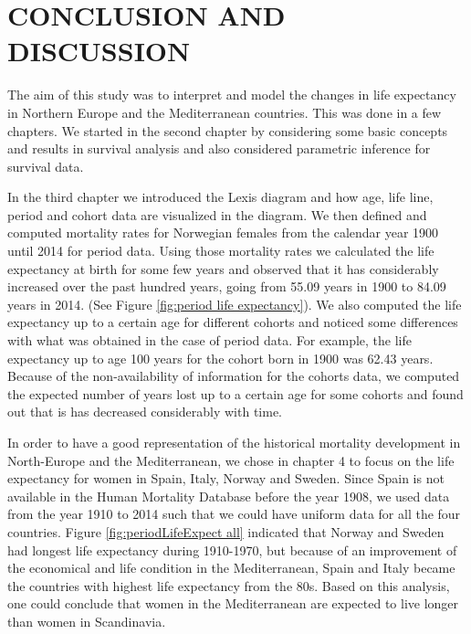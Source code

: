 
\chapter{CONCLUSION AND DISCUSSION}

The aim of this study was to interpret and model the changes in life expectancy in Northern Europe and the Mediterranean countries. This was done in a few chapters. 
We started in the second chapter by considering some basic concepts and results in survival analysis and also considered parametric inference for survival data. 

In the third chapter we introduced the Lexis diagram and how age, life line, period and cohort data are visualized in the diagram. We then defined and computed mortality rates for Norwegian females from the calendar year 1900 until 2014 for period data. Using those mortality rates we calculated the life expectancy at birth for some few years and observed that it has considerably increased over the past hundred years, going from 55.09 years in 1900 to 84.09 years in 2014. (See Figure \ref{fig:period life expectancy}). We also computed the life expectancy up to a certain age for different cohorts and noticed some differences with  what was obtained in the case of period data. For example, the life expectancy up to age 100 years for the cohort born in 1900 was 62.43 years. Because of the non-availability of information for the cohorts data, we computed the expected number of years lost up to a certain age for some cohorts and found out that is has decreased considerably with time. 

In order to have a good representation of the historical mortality development in North-Europe and the Mediterranean, we chose in chapter 4 to focus on the life expectancy for women in Spain, Italy, Norway and Sweden. Since Spain is not available in the Human Mortality Database before the year 1908, we used data from the year 1910 to 2014 such that we could have uniform data for all the four countries. Figure \ref{fig:periodLifeExpect all} indicated that Norway and Sweden had longest life expectancy during 1910-1970, but because of an improvement of the economical and life condition in the Mediterranean, Spain and Italy became the countries with highest life expectancy from the 80s. 
Based on this analysis, one could conclude that women in the Mediterranean are expected to live longer than women in Scandinavia.


